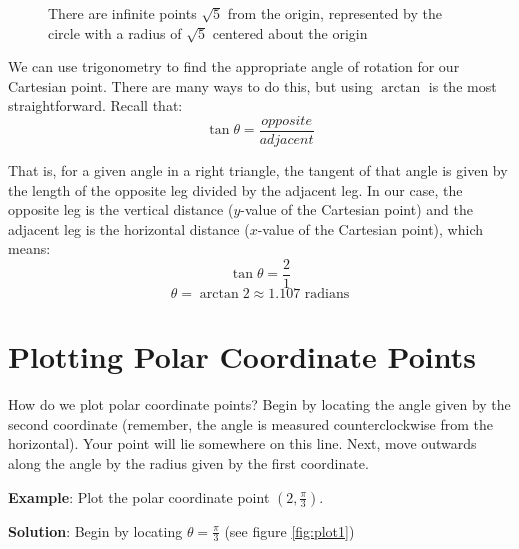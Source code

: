 \begin{figure}[htbp]
\centering
    \caption{There are infinite points $\sqrt{5}$ from the origin, represented 
    by the circle with a radius of $\sqrt{5}$ centered about the origin}
    \label{fig:circle}
    \end{figure}

We can use trigonometry to find the appropriate angle of rotation for our 
Cartesian point. There are many ways to do this, but using $\arctan$ is the 
most straightforward. Recall that:
$$\tan{\theta} = \frac{opposite}{adjacent}$$

That is, for a given angle in a right triangle, the tangent of that angle is 
given by the length of the opposite leg divided by the adjacent leg. In our 
case, the opposite leg is the vertical distance ($y$-value of the Cartesian 
point) and the adjacent leg is the horizontal distance ($x$-value of the 
Cartesian point), which means:
$$\tan{\theta} = \frac{2}{1}$$
$$\theta = \arctan{2} \approx 1.107\text{ radians}$$

\section{Plotting Polar Coordinate Points}
How do we plot polar coordinate points? Begin by locating the angle given by the second coordinate (remember, the angle is measured counterclockwise from the horizontal). Your point will lie somewhere on this line. Next, move outwards along the angle by the radius given by the first coordinate. 

\textbf{Example}: Plot the polar coordinate point $(2, \frac{\pi}{3})$. 

\textbf{Solution}: Begin by locating $\theta = \frac{\pi}{3}$ (see figure \ref{fig:plot1})

